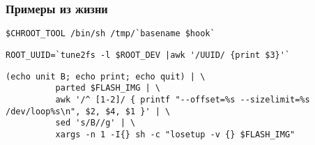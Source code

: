 \begin{frame}[fragile]
  \frametitle{Примеры из жизни}
\begin{lstlisting}[basicstyle=\normalsize]
    $CHROOT_TOOL /bin/sh /tmp/`basename $hook`
\end{lstlisting} \pause

\begin{lstlisting}[basicstyle=\normalsize]
    ROOT_UUID=`tune2fs -l $ROOT_DEV |awk '/UUID/ {print $3}'`
\end{lstlisting} \pause
  
\begin{lstlisting}[basicstyle=\small]
    (echo unit B; echo print; echo quit) | \
          parted $FLASH_IMG | \
          awk '/^ [1-2]/ { printf "--offset=%s --sizelimit=%s /dev/loop%s\n", $2, $4, $1 }' | \
          sed 's/B//g' | \
          xargs -n 1 -I{} sh -c "losetup -v {} $FLASH_IMG"
\end{lstlisting}
\end{frame}
